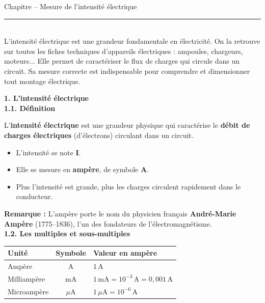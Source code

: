 \documentclass[11pt,a4paper]{article}
\renewcommand{\arraystretch}{2}
\begin{document}
\begin{center}
 \LARGE{Chapitre -- Mesure de l'intensité électrique}
\end{center}

\normalsize

\hrule\
\\[0,2cm]

L'intensité électrique est une grandeur fondamentale en électricité. On la retrouve sur toutes les fiches techniques d'appareils électriques : ampoules, chargeurs, moteurs... Elle permet de caractériser le flux de charges qui circule dans un circuit. Sa mesure correcte est indispensable pour comprendre et dimensionner tout montage électrique.

\vspace{3mm}

\textbf{1. L'intensité électrique} \\

\textbf{1.1. Définition}

\begin{tcolorbox}[colback=red!5!white,colframe=red!75!black]
{
L'\textbf{intensité électrique} est une grandeur physique qui caractérise le \textbf{débit de charges électriques} (d'électrons) circulant dans un circuit.

\begin{itemize}
    \item L'intensité se note \textbf{I}.
    \item Elle se mesure en \textbf{ampère}, de symbole \textbf{A}.
    \item Plus l'intensité est grande, plus les charges circulent rapidement dans le conducteur.
\end{itemize}
}
\end{tcolorbox}

\textbf{Remarque : } L'ampère porte le nom du physicien français \textbf{André-Marie Ampère} (1775--1836), l'un des fondateurs de l'électromagnétisme. \\

\textbf{1.2. Les multiples et sous-multiples}

\vspace{8mm}

\begin{center}
\renewcommand{\arraystretch}{1.5}
\begin{tabular}{|l|c|l|}
\hline
\textbf{Unité} & \textbf{Symbole} & \textbf{Valeur en ampère} \\
\hline
Ampère       & A    & $1\,\text{A}$ \\
\hline
Milliampère  & mA   & $1\,\text{mA} = 10^{-3}\,\text{A} = 0{,}001\,\text{A}$ \\
\hline
Microampère  & $\mu$A & $1\,\mu\text{A} = 10^{-6}\,\text{A}$ \\
\hline
\end{tabular}
\end{center}
\end{document}
